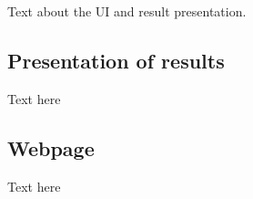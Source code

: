 Text about the UI and result presentation.


\subsection{Presentation of results}
Text here

\subsection{Webpage}
Text here

